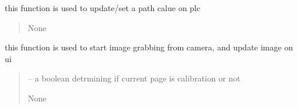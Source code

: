 \documentclass[letterpaper,10pt,english]{sphinxmanual}
\begin{document}
\begin{savenotes}
\begin{fulllineitems}
\begin{savenotes}
\begin{fulllineitems}
\begin{quote}
\begin{description}
\end{description}\end{quote}

\end{fulllineitems}\end{savenotes}


\begin{savenotes}\begin{fulllineitems}
\label{\detokenize{setting/setting_api:oxin.setting_api.API.set_plc_value}}
\pysigstartsignatures
{}
\pysigstopsignatures
\sphinxAtStartPar
this function is used to update/set a path calue on plc
\begin{quote}\begin{description}
\sphinxAtStartPar
None

\end{description}\end{quote}

\end{fulllineitems}\end{savenotes}


\begin{savenotes}\begin{fulllineitems}
\label{\detokenize{setting/setting_api:oxin.setting_api.API.show_camera_picture}}
\pysigstartsignatures
{}
\pysigstopsignatures
\sphinxAtStartPar
this function is used to start image grabbing from camera, and update image on ui
\begin{quote}\begin{description}
\sphinxAtStartPar
{} – a boolean detrmining if current page is calibration or not

\sphinxAtStartPar
None

\end{description}\end{quote}


\end{fulllineitems}
\end{savenotes}
\end{fulllineitems}
\end{savenotes}
\end{document}

